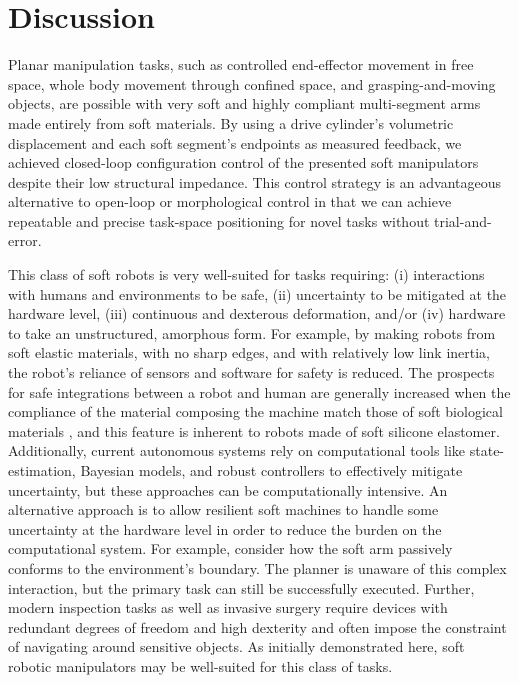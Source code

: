 \section{Discussion}
\label{sec:discussion}
Planar manipulation tasks, such as controlled end-effector movement in free space, whole body movement through confined space, and grasping-and-moving objects, are possible with very soft and highly compliant multi-segment arms made entirely from soft materials.
%
By using a drive cylinder's volumetric displacement and each soft segment's endpoints as measured feedback, we achieved closed-loop configuration control of the presented soft manipulators despite their low structural impedance.
%
This control strategy is an advantageous alternative to open-loop or morphological control in that we can achieve repeatable and precise task-space positioning for novel tasks without trial-and-error.

This class of soft robots is very well-suited for tasks requiring: (i) interactions with humans and environments to be safe, (ii) uncertainty to be mitigated at the hardware level, (iii) continuous and dexterous deformation, and/or (iv) hardware to take an unstructured, amorphous form.
%
For example, by making robots from soft elastic materials, with no sharp edges, and with relatively low link inertia, the robot's reliance of sensors and software for safety is reduced.
%
The prospects for safe integrations between a robot and human are generally increased when the compliance of the material composing the machine match those of soft biological materials \citet{majidi2014soft}, and this feature is inherent to robots made of soft silicone elastomer.
%
Additionally, current autonomous systems rely on computational tools like state-estimation, Bayesian models, and robust controllers to effectively mitigate uncertainty, but these approaches can be computationally intensive.
%
An alternative approach is to allow resilient soft machines to handle some uncertainty at the hardware level in order to reduce the burden on the computational system.
%
For example, consider how the soft arm passively conforms to the environment's boundary. The planner is unaware of this complex interaction, but the primary task can still be successfully executed.
%
Further, modern inspection tasks as well as invasive surgery require devices with redundant degrees of freedom and high dexterity and often impose the constraint of navigating around sensitive objects.
%
As initially demonstrated here, soft robotic manipulators may be well-suited for this class of tasks.

